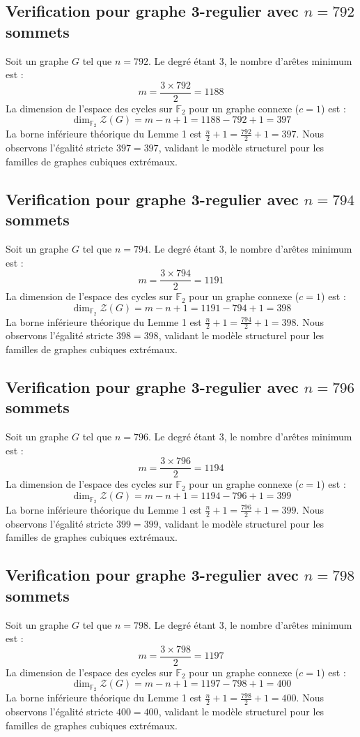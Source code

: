 \documentclass[11pt,a4paper]{article}
\begin{document}
\subsection{Verification pour graphe 3-regulier avec $n=792$ sommets}
Soit un graphe $G$ tel que $n = 792$. Le degré étant 3, le nombre d'arêtes minimum est :
$$ m = \frac{3 \times 792}{2} = 1188 $$
La dimension de l'espace des cycles sur $\mathbb{F}_2$ pour un graphe connexe ($c=1$) est :
$$ \dim_{\mathbb{F}_2} \mathcal{Z}(G) = m - n + 1 = 1188 - 792 + 1 = 397 $$
La borne inférieure théorique du Lemme 1 est $\frac{n}{2} + 1 = \frac{792}{2} + 1 = 397$.
Nous observons l'égalité stricte $397 = 397$, validant le modèle structurel pour les familles de graphes cubiques extrémaux.

\subsection{Verification pour graphe 3-regulier avec $n=794$ sommets}
Soit un graphe $G$ tel que $n = 794$. Le degré étant 3, le nombre d'arêtes minimum est :
$$ m = \frac{3 \times 794}{2} = 1191 $$
La dimension de l'espace des cycles sur $\mathbb{F}_2$ pour un graphe connexe ($c=1$) est :
$$ \dim_{\mathbb{F}_2} \mathcal{Z}(G) = m - n + 1 = 1191 - 794 + 1 = 398 $$
La borne inférieure théorique du Lemme 1 est $\frac{n}{2} + 1 = \frac{794}{2} + 1 = 398$.
Nous observons l'égalité stricte $398 = 398$, validant le modèle structurel pour les familles de graphes cubiques extrémaux.

\subsection{Verification pour graphe 3-regulier avec $n=796$ sommets}
Soit un graphe $G$ tel que $n = 796$. Le degré étant 3, le nombre d'arêtes minimum est :
$$ m = \frac{3 \times 796}{2} = 1194 $$
La dimension de l'espace des cycles sur $\mathbb{F}_2$ pour un graphe connexe ($c=1$) est :
$$ \dim_{\mathbb{F}_2} \mathcal{Z}(G) = m - n + 1 = 1194 - 796 + 1 = 399 $$
La borne inférieure théorique du Lemme 1 est $\frac{n}{2} + 1 = \frac{796}{2} + 1 = 399$.
Nous observons l'égalité stricte $399 = 399$, validant le modèle structurel pour les familles de graphes cubiques extrémaux.

\subsection{Verification pour graphe 3-regulier avec $n=798$ sommets}
Soit un graphe $G$ tel que $n = 798$. Le degré étant 3, le nombre d'arêtes minimum est :
$$ m = \frac{3 \times 798}{2} = 1197 $$
La dimension de l'espace des cycles sur $\mathbb{F}_2$ pour un graphe connexe ($c=1$) est :
$$ \dim_{\mathbb{F}_2} \mathcal{Z}(G) = m - n + 1 = 1197 - 798 + 1 = 400 $$
La borne inférieure théorique du Lemme 1 est $\frac{n}{2} + 1 = \frac{798}{2} + 1 = 400$.
Nous observons l'égalité stricte $400 = 400$, validant le modèle structurel pour les familles de graphes cubiques extrémaux.
\end{document}

